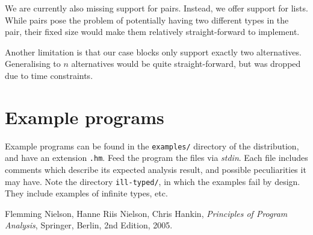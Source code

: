 \documentclass[a4paper]{article}
\begin{document}
We are currently also missing support for pairs. Instead, we offer support for
lists. While pairs pose the problem of potentially having two different types in
the pair, their fixed size would make them relatively straight-forward to implement.

Another limitation is that our case blocks only support exactly two alternatives.
Generalising to $n$ alternatives would be quite straight-forward, but was dropped
due to time constraints.


\section{Example programs}

Example programs can be found in the \texttt{examples/} directory of the distribution, 
and have an extension \texttt{.hm}. Feed the program the files via \emph{stdin}. Each file
includes comments which describe its expected analysis result, and possible peculiarities
it may have. Note the directory \texttt{ill-typed/}, in which the examples fail by design.
They include examples of infinite types, etc. 


\begin{thebibliography}{9}

  {Flemming Nielson, Hanne Riis Nielson, Chris Hankin},
  \emph{Principles of Program Analysis},
  Springer, Berlin,
  2nd Edition,
  2005.

\end{thebibliography}
\end{document}
